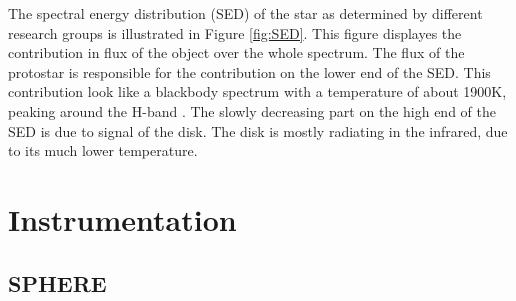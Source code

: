 \documentclass[twoside,single]{lion-msc}
\begin{document}
The spectral energy distribution (SED) of the star as determined by different research groups is illustrated in Figure \ref{fig:SED}. This figure displayes the contribution in flux of the object over the whole spectrum. The flux of the protostar is responsible for the contribution on the lower end of the SED. This contribution look like a blackbody spectrum with a temperature of about 1900K, peaking around the H-band \citep{Padgett}. The slowly decreasing part on the high end of the SED is due to signal of the disk. The disk is mostly radiating in the infrared, due to its much lower temperature.

\chapter{Instrumentation}
\section{SPHERE}
\end{document}
